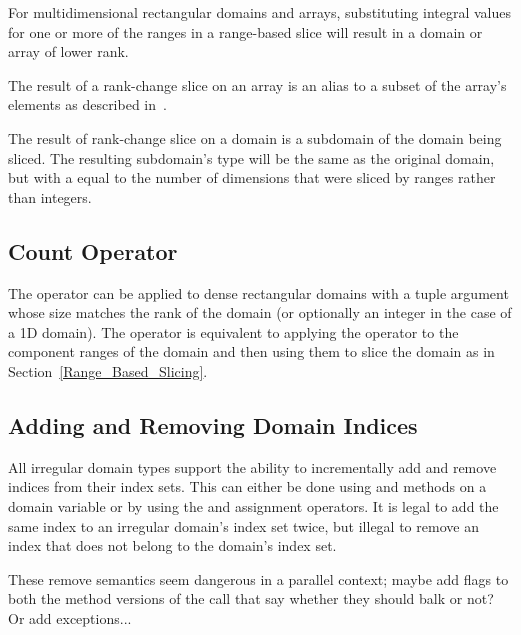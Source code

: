 For multidimensional rectangular domains and arrays, substituting
integral values for one or more of the ranges in a range-based slice
will result in a domain or array of lower rank.

The result of a rank-change slice on an array is an alias to a subset
of the array's elements as described
in~.

The result of rank-change slice on a domain is a subdomain of the
domain being sliced.  The resulting
subdomain's type will be the same as the original domain, but with
a  equal to the number of dimensions that were sliced by
ranges rather than integers.


\subsection{Count Operator}
\label{Count_Operator_Domains}
The \chpl{\#} operator can be applied to dense rectangular domains with
a tuple argument whose size matches the rank of the domain (or
optionally an integer in the case of a 1D domain).  The operator is
equivalent to applying the \chpl{\#} operator to the component ranges
of the domain and then using them to slice the domain as in
Section~\ref{Range_Based_Slicing}.


\subsection{Adding and Removing Domain Indices}
\label{Adding_and_Removing_Domain_Indices}

All irregular domain types support the ability to incrementally add
and remove indices from their index sets.  This can either be done
using  and  methods on a
domain variable or by using the \chpl{+=} and \chpl{-=} assignment
operators.  It is legal to add the same index to an irregular domain's
index set twice, but illegal to remove an index that does not belong
to the domain's index set.

\begin{openissue}
These remove semantics seem dangerous in a parallel context; maybe
add flags to both the method versions of the call that say whether
they should balk or not?  Or add exceptions...
\end{openissue}

